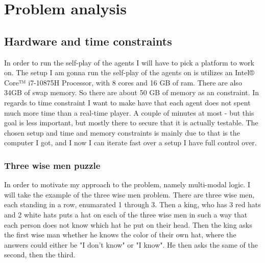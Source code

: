 \section{Problem analysis}

\subsection{Hardware and time constraints}
In order to run the self-play of the agents I will have to pick a platform to work on.
The setup I am gonna run the self-play of the agents on is utilizes an Intel® Core™ i7-10875H Processor, with 8 cores and 16 GB of ram. There are also 34GB of swap memory. So there are about 50 GB of memory as an constraint.
In regards to time constraint I want to make have that each agent does not spent much more time than a real-time player. A couple of minutes at most - but this goal is less important, but mostly there to secure that it is actually testable.
The chosen setup and time and memory constraints is mainly due to that is the computer I got, and I now I can iterate fast over a setup I have full control over.



\subsubsection{Three wise men puzzle}
In order to motivate my approach to the problem, namely multi-modal logic. 
I will take the example of the three wise men problem.
There are three wise men, each standing in a row, enumarated 1 through 3. 
Then a king, who has 3 red hats and 2 white hats puts a hat on each of the three wise men in such a way that each person does not know which hat he put on their head. 
Then the king asks the first wise man whether he knows the color of their own hat, where the answers could either be "I don't know" or "I know". 
He then asks the same of the second, then the third.

